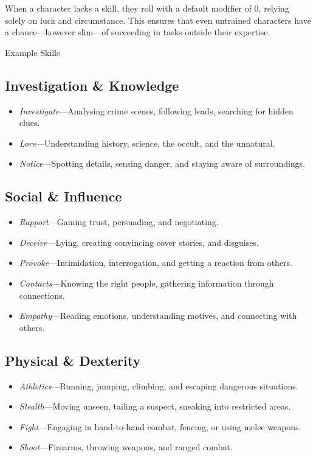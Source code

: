 When a character lacks a skill, they roll with a default modifier of 0, relying solely on luck and circumstance. This ensures that even untrained characters have a chance—however slim—of succeeding in tasks outside their expertise.



\begin{WyrdExampleSidebar}[float=!t]{Example Skills}
	\subsection*{Investigation \& Knowledge}  
	\begin{itemize}
    	\item \emph{Investigate}---Analysing crime scenes, following leads, searching for hidden clues.
	    \item \emph{Lore}---Understanding history, science, the occult, and the unnatural.
	    \item \emph{Notice}---Spotting details, sensing danger, and staying aware of surroundings.
	\end{itemize}

	\subsection*{Social \& Influence}  
	\begin{itemize}
    	\item \emph{Rapport}---Gaining trust, persuading, and negotiating.
	    \item \emph{Deceive}---Lying, creating convincing cover stories, and disguises.
    	\item \emph{Provoke}---Intimidation, interrogation, and getting a reaction from others.
	    \item \emph{Contacts}---Knowing the right people, gathering information through connections.
		\item \emph{Empathy}---Reading emotions, understanding motives, and connecting with others.
	\end{itemize}

	\subsection*{Physical \& Dexterity}  
	\begin{itemize}
    	\item \emph{Athletics}---Running, jumping, climbing, and escaping dangerous situations.
	    \item \emph{Stealth}---Moving unseen, tailing a suspect, sneaking into restricted areas.
	    \item \emph{Fight}---Engaging in hand-to-hand combat, fencing, or using melee weapons.
	    \item \emph{Shoot}---Firearms, throwing weapons, and ranged combat.
	\end{itemize}


\end{WyrdExampleSidebar}
